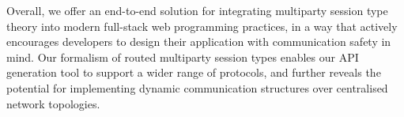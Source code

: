 Overall, we offer an end-to-end solution for integrating
multiparty session type theory into modern full-stack web programming
practices, in a way that actively encourages developers to
design their application with communication safety in mind.
Our formalism of routed multiparty session types enables our
API generation tool to support a wider range of protocols, and
further reveals the potential
for implementing dynamic communication structures 
over centralised
network topologies.